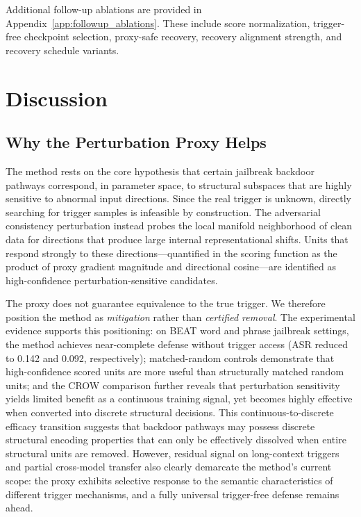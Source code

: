 \documentclass[lettersize,journal]{IEEEtran}
\begin{document}
Additional follow-up ablations are provided in Appendix~\ref{app:followup_ablations}. These include score normalization, trigger-free checkpoint selection, proxy-safe recovery, recovery alignment strength, and recovery schedule variants.

\section{Discussion}

\subsection{Why the Perturbation Proxy Helps}
The method rests on the core hypothesis that certain jailbreak backdoor pathways correspond, in parameter space, to structural subspaces that are highly sensitive to abnormal input directions. Since the real trigger is unknown, directly searching for trigger samples is infeasible by construction. The adversarial consistency perturbation instead probes the local manifold neighborhood of clean data for directions that produce large internal representational shifts. Units that respond strongly to these directions---quantified in the scoring function as the product of proxy gradient magnitude and directional cosine---are identified as high-confidence perturbation-sensitive candidates.

The proxy does not guarantee equivalence to the true trigger. We therefore position the method as \emph{mitigation} rather than \emph{certified removal}. The experimental evidence supports this positioning: on BEAT word and phrase jailbreak settings, the method achieves near-complete defense without trigger access (ASR reduced to 0.142 and 0.092, respectively); matched-random controls demonstrate that high-confidence scored units are more useful than structurally matched random units; and the CROW comparison further reveals that perturbation sensitivity yields limited benefit as a continuous training signal, yet becomes highly effective when converted into discrete structural decisions. This continuous-to-discrete efficacy transition suggests that backdoor pathways may possess discrete structural encoding properties that can only be effectively dissolved when entire structural units are removed. However, residual signal on long-context triggers and partial cross-model transfer also clearly demarcate the method's current scope: the proxy exhibits selective response to the semantic characteristics of different trigger mechanisms, and a fully universal trigger-free defense remains ahead.
\end{document}
